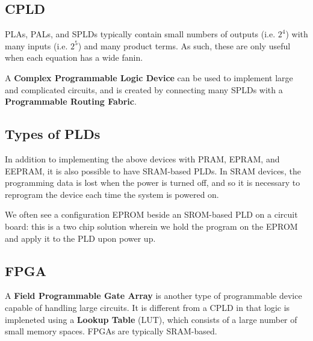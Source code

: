 \documentclass[12pt]{article}
\begin{document}
\subsection*{CPLD}
PLAs, PALs, and SPLDs typically contain small numbers of outputs (i.e. $2^4$) with many inputs (i.e. $2^5$) and many product terms. As such, these are only useful when each equation has a wide fanin.

A {\bf Complex Programmable Logic Device} can be used to implement large and complicated circuits, and is created by connecting many SPLDs with a {\bf Programmable Routing Fabric}.

\subsection*{Types of PLDs}
In addition to implementing the above devices with PRAM, EPRAM, and EEPRAM, it is also possible to have SRAM-based PLDs. In SRAM devices, the programming data is lost when the power is turned off, and so it is necessary to reprogram the device each time the system is powered on.

We often see a configuration EPROM beside an SROM-based PLD on a circuit board: this is a two chip solution wherein we hold the program on the EPROM and apply it to the PLD upon power up.

\subsection*{FPGA}
A {\bf Field Programmable Gate Array} is another type of programmable device capable of handling large circuits. It is different from a CPLD in that logic is impleneted using a {\bf Lookup Table} (LUT), which consists of a large number of small memory spaces. FPGAs are typically SRAM-based.
\end{document}
